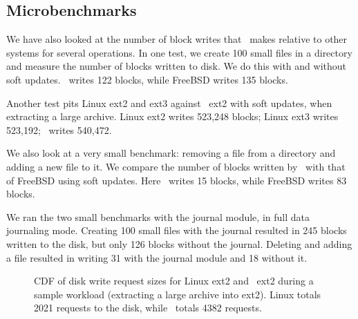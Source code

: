 \begin{comment}
\begin{figure}[htb]
\vspace{-0.5\baselineskip}
\centering{
\texttt{[image: rb\_chdesc\_size]}
}
\vspace{-0.5\baselineskip}
\caption{\label{fig:patchsize-histo} \Rb\ \chdesc\ size histogram for a sample
workload (extracting a large archive into ext2). All the \chdescs\ larger than
63 bytes have been optimized into \nrb\ \chdescs. \Rb\ \chdescs\ 4 bytes and
smaller account for about 51\% of all \rb\ \chdescs.}
\end{figure}
\end{comment}

\subsection {Microbenchmarks}
We have also looked at the number of block writes that \Kudos\ makes
relative to other systems for several operations. In one test, we
create 100 small files in a directory and measure the number of blocks
written to disk. We do this with and without soft updates. \Kudos\
writes 122 blocks, while FreeBSD writes 135 blocks.

Another test pits Linux ext2 and ext3 against \Kudos\ ext2 with soft updates,
when extracting a large archive. Linux ext2 writes 523,248 blocks; Linux ext3
writes 523,192; \Kudos\ writes 540,472.

We also look at a very small benchmark: removing a file from a
directory and adding a new file to it. We compare the number of blocks
written by \Kudos\ with that of FreeBSD using soft updates. Here
\Kudos\ writes 15 blocks, while FreeBSD writes 83 blocks.

We ran the two small benchmarks with the journal module, in full
data journaling mode. Creating 100 small files with the journal
resulted in 245 blocks written to the disk, but only 126 blocks
without the journal. Deleting and adding a file resulted in writing
31 with the journal module and 18 without it.

\begin{figure}[htb]
\vspace{-0.5\baselineskip}
\vspace{-0.5\baselineskip}
\caption{\label{fig:mergereq-cdf} CDF of disk write request sizes for
  Linux ext2 and \Kudos\ ext2 during a sample workload (extracting a large
  archive into ext2). Linux totals 2021 requests to the disk, while \Kudos\
  totals 4382 requests.}
\end{figure}

